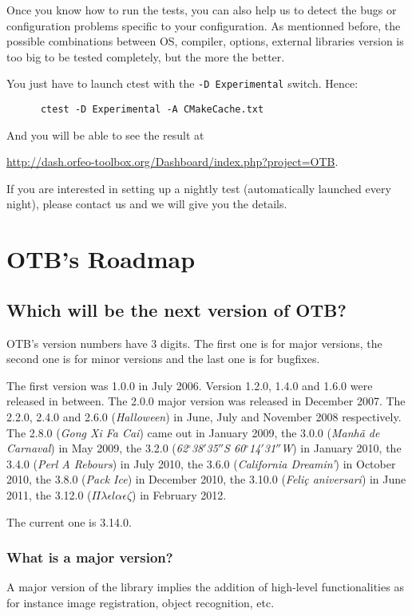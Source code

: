 Once you know how to run the tests, you can also help us to detect the bugs or configuration problems specific to your configuration. As mentionned before, the possible combinations between OS, compiler, options, external libraries version is too big to be tested completely, but the more the better.

You just have to launch ctest with the \texttt{-D Experimental} switch. Hence:
\begin{verbatim}
      ctest -D Experimental -A CMakeCache.txt
\end{verbatim}

And you will be able to see the result at

\url{http://dash.orfeo-toolbox.org/Dashboard/index.php?project=OTB}.

If you are interested in setting up a nightly test (automatically launched every night), please contact us and we will give you the details.

\section{OTB's Roadmap}

\subsection{Which will be the next version of OTB?}
OTB's version numbers have 3 digits. The first one is for major
versions, the second one is for minor versions and the last one is for
bugfixes.

The first version was 1.0.0 in July 2006. Version 1.2.0, 1.4.0 and 1.6.0 were
released in between. The 2.0.0 major version  was released in December 2007.
The 2.2.0, 2.4.0 and 2.6.0 ({\em Halloween}) in June, July and November 2008 respectively. The
2.8.0 ({\em Gong Xi Fa Cai}) came out in January 2009, the 3.0.0 ({\em Manh\~{a} de Carnaval}) in May 2009, the 3.2.0 ({\em 62$^\circ$38${'}$35${''}$S 60$^\circ$14${'}$31${''}$W}) in January 2010, the 3.4.0 ({\em Perl A Rebours}) in July 2010, the 3.6.0 ({\em California Dreamin'}) in October 2010, the 3.8.0 ({\em Pack Ice}) in December 2010, the 3.10.0 ({\em Feli\c{c} aniversari}) in June 2011, the 3.12.0 ({\em $\Pi \lambda \epsilon l \alpha \epsilon \zeta$}) in February 2012.

The current one is 3.14.0.

\subsubsection{What is a major version?}
A major version of the library implies the addition of high-level
functionalities as for instance image registration, object recognition, etc.


